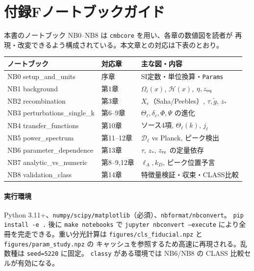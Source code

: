 \section*{付録F\quad ノートブックガイド}

本書のノートブック NB0--NB8 は \texttt{cmbcore} を用い、各章の数値図を読者が
再現・改変できるよう構成されている。本文章との対応は下表のとおり。

\begin{center}
\begin{tabular}{lll}
\hline
ノートブック & 対応章 & 主な図・内容 \\
\hline
NB0 setup\_and\_units & 序章 & SI定数・単位換算・\texttt{Params} \\
NB1 background & 第1章 & $\Omega_i(x)$, $\mathcal H(x)$, $\eta,z_{\rm eq}$ \\
NB2 recombination & 第3章 & $X_e$（Saha/Peebles）, $\tau,\tilde g$, $z_*$ \\
NB3 perturbations\_single\_k & 第6--9章 & $\Theta_\ell,\delta_c,\Phi,\Psi$ の進化 \\
NB4 transfer\_functions & 第10章 & ソース4項, $\Theta_\ell(k)$, $j_\ell$ \\
NB5 power\_spectrum & 第11--12章 & $\mathcal D_\ell$ vs Planck, ピーク検出 \\
NB6 parameter\_dependence & 第13章 & $\tau$, $z_*$, $z_{\rm re}$ の定量依存 \\
NB7 analytic\_vs\_numeric & 第8--9,12章 & $\ell_A,k_D$, ピーク位置予言 \\
NB8 validation\_class & 第14章 & 特徴量検証・収束・CLASS比較 \\
\hline
\end{tabular}
\end{center}

\paragraph{実行環境}
Python 3.11+、\texttt{numpy/scipy/matplotlib}（必須）、\texttt{nbformat/nbconvert}。
\texttt{pip install -e .} 後に \texttt{make notebooks} で
\texttt{jupyter nbconvert --execute} により全冊を完走できる。重い分光計算は
\texttt{figures/cls\_fiducial.npz} と \texttt{figures/param\_study.npz} の
キャッシュを参照するため高速に再現される。乱数種は \texttt{seed=5220} に固定。
\texttt{classy} がある環境では NB6/NB8 の CLASS 比較セルが有効になる。
